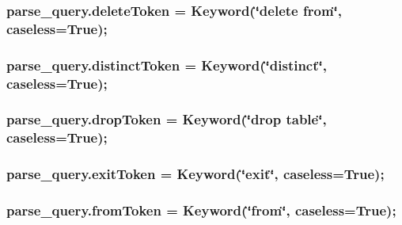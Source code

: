 \subsubsection[{\texorpdfstring{delete\+Token}{deleteToken}}]{\setlength{\rightskip}{0pt plus 5cm}parse\+\_\+query.\+delete\+Token = Keyword(\char`\"{}delete from\char`\"{}, caseless=True);}\hypertarget{namespaceparse__query_a2e9d87bd383bef60ce74b0badf23cd4a}{}\label{namespaceparse__query_a2e9d87bd383bef60ce74b0badf23cd4a}
\subsubsection[{\texorpdfstring{distinct\+Token}{distinctToken}}]{\setlength{\rightskip}{0pt plus 5cm}parse\+\_\+query.\+distinct\+Token = Keyword(\char`\"{}distinct\char`\"{}, caseless=True);}\hypertarget{namespaceparse__query_a12a40f814458cd318eb56742bc0a84ab}{}\label{namespaceparse__query_a12a40f814458cd318eb56742bc0a84ab}
\subsubsection[{\texorpdfstring{drop\+Token}{dropToken}}]{\setlength{\rightskip}{0pt plus 5cm}parse\+\_\+query.\+drop\+Token = Keyword(\char`\"{}drop {\bf table}\char`\"{}, caseless=True);}\hypertarget{namespaceparse__query_a5b967e0942a66c2cd672cffd95199882}{}\label{namespaceparse__query_a5b967e0942a66c2cd672cffd95199882}
\subsubsection[{\texorpdfstring{exit\+Token}{exitToken}}]{\setlength{\rightskip}{0pt plus 5cm}parse\+\_\+query.\+exit\+Token = Keyword(\char`\"{}exit\char`\"{}, caseless=True);}\hypertarget{namespaceparse__query_a5f6923b6db3ab18f01b7c58ba767cd0d}{}\label{namespaceparse__query_a5f6923b6db3ab18f01b7c58ba767cd0d}
\subsubsection[{\texorpdfstring{from\+Token}{fromToken}}]{\setlength{\rightskip}{0pt plus 5cm}parse\+\_\+query.\+from\+Token = Keyword(\char`\"{}from\char`\"{}, caseless=True);}\hypertarget{namespaceparse__query_ae9bf3d0493a1acaac4f260dbdaf13fbd}{}\label{namespaceparse__query_ae9bf3d0493a1acaac4f260dbdaf13fbd}
